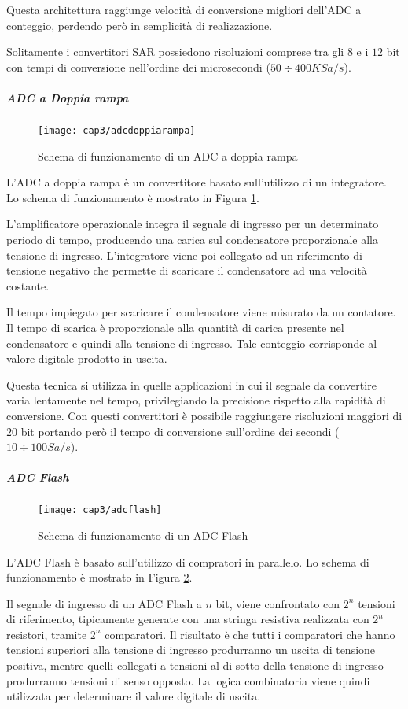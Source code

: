 Questa architettura raggiunge velocità di conversione migliori dell'ADC a conteggio, perdendo però in semplicità di realizzazione.

Solitamente i convertitori SAR possiedono risoluzioni comprese tra gli $8$ e i $12$ bit con tempi di conversione nell'ordine dei microsecondi ($50 \div 400 KSa/s$).

\subparagraph{\textbf{ADC a Doppia rampa}}
\begin{figure}  
  \begin{center}
    \texttt{[image: cap3/adcdoppiarampa]}
    \caption{Schema di funzionamento di un ADC a doppia rampa}
    \label{adcdoppiarampa}
  \end{center}
\end{figure}
L'ADC a doppia rampa è un convertitore basato sull'utilizzo di un integratore. Lo schema di funzionamento è mostrato in Figura \ref{adcdoppiarampa}.

L'amplificatore operazionale integra il segnale di ingresso per un determinato periodo di tempo, producendo una carica sul condensatore proporzionale alla tensione di ingresso. L'integratore viene poi collegato ad un riferimento di tensione negativo che permette di scaricare il condensatore ad una velocità costante.

Il tempo impiegato per scaricare il condensatore viene misurato da un contatore. Il tempo di scarica è proporzionale alla quantità di carica presente nel condensatore e quindi alla tensione di ingresso. Tale conteggio corrisponde al valore digitale prodotto in uscita.

Questa tecnica si utilizza in quelle applicazioni in cui il segnale da convertire varia lentamente nel tempo, privilegiando la precisione rispetto alla rapidità di conversione. Con questi convertitori è possibile raggiungere risoluzioni maggiori di $20$ bit portando però il tempo di conversione sull'ordine dei secondi ($10 \div 100 Sa/s$).

\subparagraph{\textbf{ADC Flash}}
\begin{figure}  
  \begin{center}
    \texttt{[image: cap3/adcflash]}
    \caption{Schema di funzionamento di un ADC Flash}
    \label{adcflash}
  \end{center}
\end{figure}
L'ADC Flash è basato sull'utilizzo di compratori in parallelo. Lo schema di funzionamento è mostrato in Figura \ref{adcflash}.

Il segnale di ingresso di un ADC Flash a $n$ bit, viene confrontato con $2^n$ tensioni di riferimento, tipicamente generate con una stringa resistiva realizzata con $2^n$ resistori, tramite $2^n$ comparatori. Il risultato è che tutti i comparatori che hanno tensioni superiori alla tensione di ingresso produrranno un uscita di tensione positiva, mentre quelli collegati a tensioni al di sotto della tensione di ingresso produrranno tensioni di senso opposto. La logica combinatoria viene quindi utilizzata per determinare il valore digitale di uscita.

